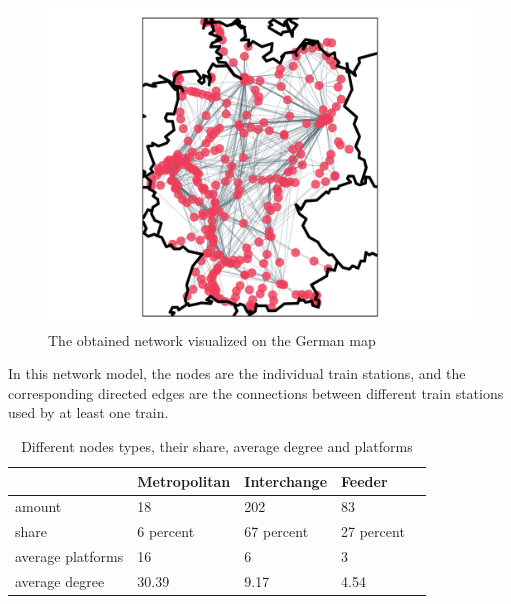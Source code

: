 \documentclass[12pt,a4paper]{article}
\begin{document}
\begin{figure}[h]
  \includegraphics[clip=true,width=\columnwidth]{../data/visualizations/network.png}
  \caption{The obtained network visualized on the German map}
   \label{fig:network-map}
\end{figure}

In this network model, the nodes are the individual train stations, and the corresponding directed edges are the connections between different train stations used by at least one train. 

\begin{table}[]
  \centering
  \begin{tabular}{lllll}
  \hline
                 & \textbf{Metropolitan} & \textbf{Interchange} & \textbf{Feeder} &  \\ \hline
  amount         & 18                                    & 202                          & 83                              &  \\
  share     & 6 percent                             & 67 percent                   & 27 percent                      &  \\
  average platforms     & 16                            & 6                   & 3                 &  \\
  average degree & 30.39                                 & 9.17                         & 4.54                            &  \\ \hline
  \end{tabular}
  \caption{Different nodes types, their share, average degree and platforms}
   \label{fig:network-overview}
\end{table}
\end{document}
